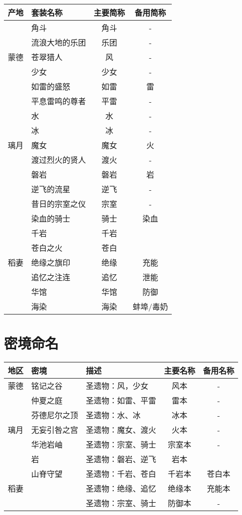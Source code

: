 \begin{longtabu}{|c|X[c]|c|c|}
	\hline
	{产地} & {套装名称} & {主要简称} & {备用简称} \\
	\hline
	\endhead
	\hline
	\endfoot
	{} & {角斗} & {角斗} & {-} \\
	{} & {流浪大地的乐团} & {乐团} & {-} \\
	\hline
	{蒙德} & {苍翠猎人} & {风} & {-} \\
	{} & {少女} & {少女} & {-} \\
	{} & {如雷的盛怒} & {如雷} & {雷} \\
	{} & {平息雷鸣的尊者} & {平雷} & {-} \\
	{} & {水} & {水} & {-} \\
	{} & {冰} & {冰} & {-} \\
	\hline
	{璃月} & {魔女} & {魔女} & {火} \\
	{} & {渡过烈火的贤人} & {渡火} & {-} \\
	{} & {磐岩} & {磐岩} & {岩} \\
	{} & {逆飞的流星} & {逆飞} & {-} \\
	{} & {昔日的宗室之仪} & {宗室} & {-} \\
	{} & {染血的骑士} & {骑士} & {染血} \\
	{} & {千岩} & {千岩} & {} \\
	{} & {苍白之火} & {苍白} & {} \\
	\hline
	{稻妻} & {绝缘之旗印} & {绝缘} & {充能} \\
	{} & {追忆之注连} & {追忆} & {泄能} \\
	{} & {华馆} & {华馆} & {防御} \\
	{} & {海染} & {海染} & {蚌埠/毒奶} \\
\end{longtabu}




\section{密境命名}

\begin{longtabu}{|c|X[c]|l|c|c|}
	\hline
	{地区} & {密境} & {描述} & {主要名称} & {备用名称} \\
	\hline
	\endhead
	\hline
	\endfoot
	{蒙德} & {铭记之谷} & {圣遗物：风，少女} & {风本} & {-} \\
	{ } & {仲夏之庭} & {圣遗物：如雷、平雷} & {雷本} & {-} \\
	{ } & {芬德尼尔之顶} & {圣遗物：水、冰} & {冰本} & {-} \\
	\hline
	{璃月} & {无妄引咎之宫} & {圣遗物：魔女、渡火} & {火本} & {-} \\
	{ } & {华池岩岫} & {圣遗物：宗室、骑士} & {宗室本} & {-} \\
	{ } & {岩} & {圣遗物：磐岩、逆飞} & {岩本} & {} \\
	{ } & {山脊守望} & {圣遗物：千岩、苍白} & {千岩本} & {苍白本} \\
	\hline
	{稻妻} & {} & {圣遗物：绝缘、追忆} & {绝缘本} & {充能本} \\
	{ } & {} & {圣遗物：宗室、骑士} & {防御本} & {-} \\
\end{longtabu}




